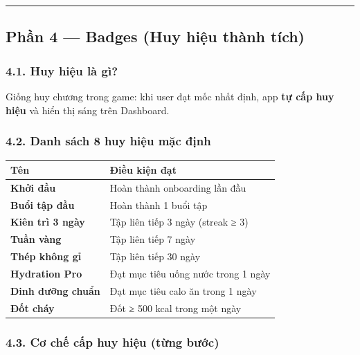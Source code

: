 \documentclass[12pt,a4paper]{article}
\newcounter{none}
\begin{document}
\begin{center}\rule{0.5\linewidth}{0.5pt}\end{center}

\subsection{Phần 4 --- Badges (Huy hiệu thành
tích)}\label{phux1ea7n-4-badges-huy-hiux1ec7u-thuxe0nh-tuxedch}

\subsubsection{4.1. Huy hiệu là gì?}\label{huy-hiux1ec7u-luxe0-guxec}

Giống huy chương trong game: khi user đạt mốc nhất định, app \textbf{tự
cấp huy hiệu} và hiển thị sáng trên Dashboard.

\subsubsection{4.2. Danh sách 8 huy hiệu mặc
định}\label{danh-suxe1ch-8-huy-hiux1ec7u-mux1eb7c-ux111ux1ecbnh}

{\def\LTcaptype{none} %
\begin{longtable}[]{@{}ll@{}}
\toprule\noalign{}
Tên & Điều kiện đạt \\
\midrule\noalign{}
\endhead
\bottomrule\noalign{}
\endlastfoot
\textbf{Khởi đầu} & Hoàn thành onboarding lần đầu \\
\textbf{Buổi tập đầu} & Hoàn thành 1 buổi tập \\
\textbf{Kiên trì 3 ngày} & Tập liên tiếp 3 ngày (streak ≥ 3) \\
\textbf{Tuần vàng} & Tập liên tiếp 7 ngày \\
\textbf{Thép không gỉ} & Tập liên tiếp 30 ngày \\
\textbf{Hydration Pro} & Đạt mục tiêu uống nước trong 1 ngày \\
\textbf{Dinh dưỡng chuẩn} & Đạt mục tiêu calo ăn trong 1 ngày \\
\textbf{Đốt cháy} & Đốt ≥ 500 kcal trong một ngày \\
\end{longtable}
}

\subsubsection{4.3. Cơ chế cấp huy hiệu (từng
bước)}\label{cux1a1-chux1ebf-cux1ea5p-huy-hiux1ec7u-tux1eebng-bux1b0ux1edbc}
\end{document}
